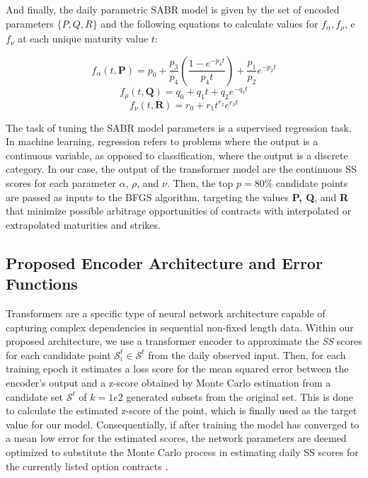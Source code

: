 And finally, the daily parametric SABR model is given by the set of encoded parameters $\{P, Q, R\}$ and the following equations to calculate values for $f_{\alpha}, f_{\rho}$, e $f_{\nu}$ at each unique maturity value $t$:

\begin{equation}\label{f_alpha}
	f_{\alpha}(t, \textbf{P}) = p_0 + \frac{p_3}{p_4} \left( \frac{1 - e^{-p_4 t}}{p_4 t} \right) + \frac{p_1}{p_2} e^{-p_2 t}
\end{equation}
\begin{equation}\label{f_rho}
	f_{\rho}(t, \textbf{Q}) = q_0 + q_1 t + q_2 e^{-q_3 t}
\end{equation}
\begin{equation}\label{f_nu}
	f_{\nu}(t, \textbf{R}) = r_0 + r_1 t^{r_2} e^{r_3 t}
\end{equation}

The task of tuning the SABR model parameters is a supervised regression task. In machine learning, regression refers to problems where the output is a continuous variable, as opposed to classification, where the output is a discrete category. In our case, the output of the transformer model are the continuous SS scores for each parameter \(\alpha\), \(\rho\), and \(\nu\). Then, the top $p=80\%$ candidate points are passed as inputs to the BFGS algorithm, targeting the values \textbf{P, Q}, and \textbf{R} that minimize possible arbitrage opportunities of contracts with interpolated or extrapolated maturities and strikes.

\subsection{Proposed Encoder Architecture and Error Functions}

Transformers are a specific type of neural network architecture capable of capturing complex dependencies in sequential non-fixed length data. Within our proposed architecture, we use a transformer encoder to approximate the \textit{SS} scores for each candidate point $\mathcal{S}_{i}^{t} \in \mathcal{S}^{t}$ from the daily observed input. Then, for each training epoch it estimates a loss score for the mean squared error between the encoder's output and a z-score obtained by Monte Carlo estimation from a candidate set $\mathcal{S}^{t}$ of $k=1e2$ generated subsets from the original set. This is done to calculate the estimated z-score of the point, which is finally used as the target value for our model. Consequentially, if after training the model has converged to a mean low error for the estimated scores, the network parameters are deemed optimized to substitute the Monte Carlo process in estimating daily SS scores for the currently listed option contracts \citep{Kim2021}.

